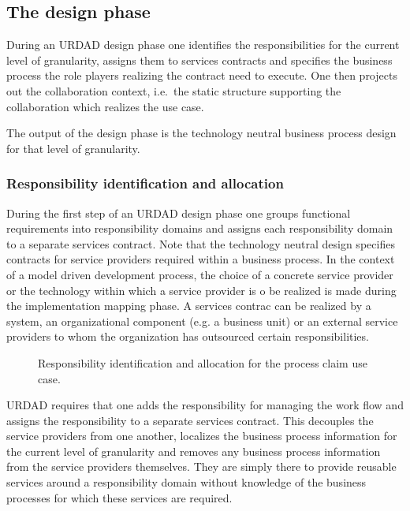 \documentclass{IOS-Book-Article}
\begin{document}
\subsection{The design phase}

During an URDAD design phase one identifies the responsibilities for the current level of granularity,
assigns them to services contracts and specifies the business process the role players realizing the contract
need to execute. One then projects out the collaboration context, i.e.\ the static structure supporting the
collaboration which realizes the use case.

The output of the design phase is the technology neutral business process design for that level of granularity.


\subsubsection{Responsibility identification and allocation}

During the first step of an URDAD design phase one groups functional requirements into  responsibility domains 
and assigns each responsibility domain to a separate services contract. 
Note that the technology neutral design specifies contracts for service providers
required within a business process.  
In the context of a model driven development process, the choice of a concrete
service provider or the technology within which a service provider is o be realized is made during the implementation 
mapping phase. A services contrac can be realized by a  system, an organizational component (e.g. a business 
unit) or an external service providers to whom the organization has outsourced 
certain responsibilities. 

\begin{figure}
  \centering
  \caption{Responsibility identification and allocation for the process claim use case.}
  \label{fig:processClaimResponsibilityAllocation}
\end{figure}

URDAD requires that one adds the responsibility for managing the work flow and assigns the responsibility to
a separate services contract. This decouples the service providers from one another, localizes the business process
information for the current level of granularity and removes any business process information from the service
providers themselves. They are simply there to provide reusable services around a responsibility domain without
knowledge of the business processes for which these services are required.
\end{document}
